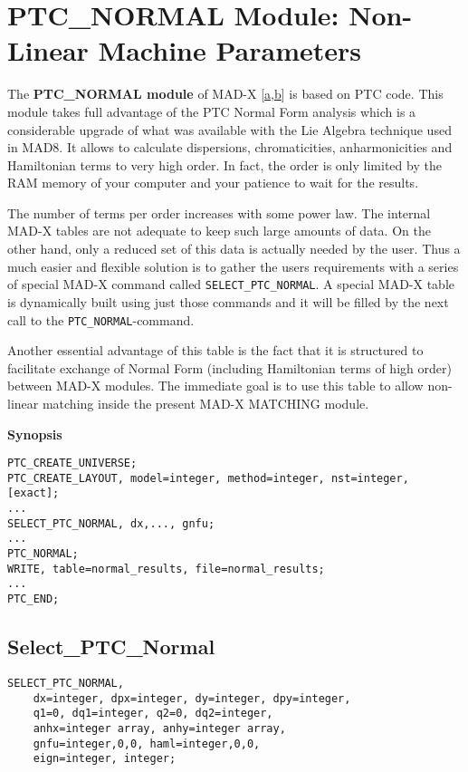 
\chapter{PTC\_NORMAL Module: Non-Linear Machine Parameters}

The {\bf PTC\_NORMAL module} of MAD-X
[\hyperlink{F._Schmidt}{a},\hyperlink{d Amico}{b}] is based on PTC
code. This module takes full advantage of the PTC Normal Form analysis
which is a considerable upgrade of what was available with
the Lie Algebra technique used in MAD8. It allows to calculate
dispersions, chromaticities, anharmonicities and Hamiltonian terms to
very high order. In fact, the order is only limited by the RAM memory
of your computer and your patience to wait for the results.  

The number of terms per order increases with some power law. The
internal MAD-X tables are not adequate to keep such large amounts of
data. On the other hand, only a reduced set of this data is actually
needed by the user. Thus a much   easier and flexible solution is to
gather the users  requirements with a series of special MAD-X command
called \texttt{SELECT\_PTC\_NORMAL}. A special MAD-X table is
dynamically built using just those commands and it will be filled by
the next call to the \texttt{PTC\_NORMAL}-command.  

Another essential advantage of this table is the fact that it is
structured to facilitate exchange of Normal Form (including
Hamiltonian terms of high order) between MAD-X modules. The immediate
goal is to use this table to allow non-linear matching inside the
present MAD-X MATCHING module. 

{\bf Synopsis} \\
\begin{verbatim}
PTC_CREATE_UNIVERSE;
PTC_CREATE_LAYOUT, model=integer, method=integer, nst=integer, [exact];
...
SELECT_PTC_NORMAL, dx,..., gnfu;
...
PTC_NORMAL;
WRITE, table=normal_results, file=normal_results;
...
PTC_END; 
\end{verbatim}

\section{Select\_PTC\_Normal} 

\begin{verbatim}
SELECT_PTC_NORMAL, 
    dx=integer, dpx=integer, dy=integer, dpy=integer,
    q1=0, dq1=integer, q2=0, dq2=integer,         
    anhx=integer array, anhy=integer array, 
    gnfu=integer,0,0, haml=integer,0,0,
    eign=integer, integer;
\end{verbatim}

